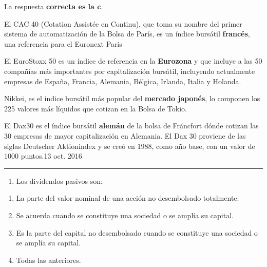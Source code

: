 \documentclass[
  letterpaper,
  DIV=11,
  numbers=noendperiod]{scrreprt}
\providecommand{\tightlist}{%
  \setlength{\itemsep}{0pt}\setlength{\parskip}{0pt}}\usepackage{longtable,booktabs,array}
\begin{document}
\begin{tcolorbox}[enhanced jigsaw, left=2mm, opacityback=0, colback=white, breakable, arc=.35mm, bottomrule=.15mm, rightrule=.15mm, toprule=.15mm, leftrule=.75mm, colframe=quarto-callout-tip-color-frame]
\begin{minipage}[t]{5.5mm}
\textcolor{quarto-callout-tip-color}{\faLightbulb}
\end{minipage}%
\begin{minipage}[t]{\textwidth - 5.5mm}

La respuesta \textbf{correcta es la c}.

El CAC 40 (Cotation Assistée en Continu), que toma su nombre del primer
sistema de automatización de la Bolsa de París, es un índice bursátil
\textbf{francés}, una referencia para el Euronext Paris

El EuroStoxx 50 es un índice de referencia en la \textbf{Eurozona} y que
incluye a las 50 compañías más importantes por capitalización bursátil,
incluyendo actualmente empresas de España, Francia, Alemania, Bélgica,
Irlanda, Italia y Holanda.

Nikkei, es el índice bursátil más popular del \textbf{mercado japonés},
lo componen los 225 valores más líquidos que cotizan en la Bolsa de
Tokio.

El Dax30 es el índice bursátil \textbf{alemán} de la bolsa de Fráncfort
dónde cotizan las 30 empresas de mayor capitalización en Alemania. El
Dax 30 proviene de las siglas Deutscher Aktionindex y se creó en 1988,
como año base, con un valor de 1000 puntos.13 oct. 2016

\end{minipage}%
\end{tcolorbox}

\begin{center}\rule{0.5\linewidth}{0.5pt}\end{center}

\begin{enumerate}
\def\labelenumi{\arabic{enumi}.}
\setcounter{enumi}{38}
\tightlist
\item
  Los dividendos pasivos son:
\end{enumerate}

\begin{enumerate}
\def\labelenumi{\alph{enumi})}
\item
  La parte del valor nominal de una acción no desembolsado totalmente.
\item
  Se acuerda cuando se constituye una sociedad o se amplía su capital.
\item
  Es la parte del capital no desembolsado cuando se constituye una
  sociedad o se amplía su capital.
\item
  Todas las anteriores.
\end{enumerate}
\end{document}

